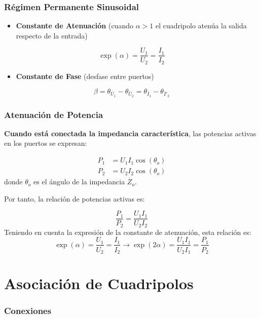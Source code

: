 \subsubsection{Régimen Permanente Sinusoidal}
\label{sec:org6afeb0f}
\begin{itemize}
\item \textbf{Constante de Atenuación} (cuando \(\alpha > 1\) el cuadripolo atenúa la salida respecto de la entrada)
\end{itemize}
\[
  \exp(\alpha) = \frac{U_1}{U_2} = \frac{I_1}{I_2}
\]
\begin{itemize}
\item \textbf{Constante de Fase} (desfase entre puertos)
\end{itemize}
\[
  \beta = \theta_{\overline{U}_1} - \theta_{\overline{U}_2} = \theta_{\overline{I}_1} - \theta_{\overline{I}'_2}
\]

\subsubsection{Atenuación de Potencia}
\label{sec:org3c1bb07}

\textbf{Cuando está conectada la impedancia característica}, las potencias activas en los puertos se expresan:

\begin{align*}
  P_1 &= U_1 I_1 \cos(\theta_o)\\
  P_2 &= U_2 I_2 \cos(\theta_o)
\end{align*}
donde \(\theta_o\) es el ángulo de la impedancia \(\overline{Z}_o\).

Por tanto, la relación de potencias activas es:

\[
\frac{P_1}{P_2} = \frac{U_1 I_1}{U_2 I_2}
\]
Teniendo en cuenta la expresión de la constante de atenuación, esta relación es:
\[
    \exp(\alpha) = \frac{U_1}{U_2} = \frac{I_1}{I_2} \rightarrow \boxed{\exp(2\alpha) = \frac{U_1 I_1}{U_2 I_1} = \frac{P_1}{P_2}}
\]

\section{Asociación de Cuadripolos}
\label{sec:org69d0c87}

\subsubsection{Conexiones}
\label{sec:orgf6e2051}

